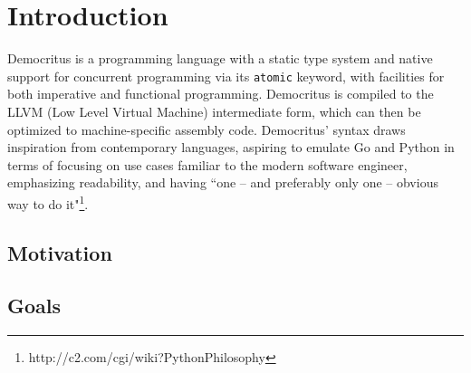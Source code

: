 \chapter{Introduction}

Democritus is a programming language with a static type system and native support for concurrent programming via its \texttt{atomic} keyword, with facilities for both imperative and functional programming. Democritus is compiled to the LLVM (Low Level Virtual Machine) intermediate form, which can then be optimized to machine-specific assembly code. Democritus' syntax draws inspiration from contemporary languages, aspiring to emulate Go and Python in terms of focusing on use cases familiar to the modern software engineer, emphasizing readability, and having ``one -- and preferably only one -- obvious way to do it"\footnote[1]{http://c2.com/cgi/wiki?PythonPhilosophy}.


\section{Motivation}

\section{Goals}
